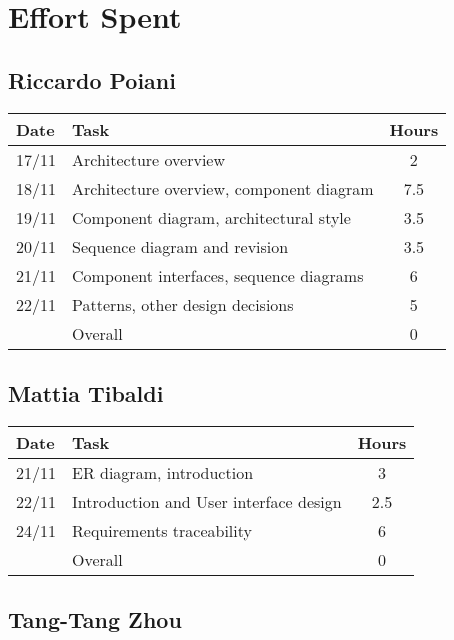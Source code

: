 \section{Effort Spent}

\subsection{Riccardo Poiani}

\begin{table}[H]
\begin{tabularx}{\textwidth}{|l|X|c|}
\hline
\rowcolor[HTML]{C0C0C0} 
Date & Task & Hours\\ \hline
17/11 & Architecture overview & 2\\ \hline
18/11 & Architecture overview, component diagram & 7.5 \\ \hline
19/11 & Component diagram, architectural style & 3.5\\ \hline
20/11 & Sequence diagram and revision & 3.5\\ \hline
21/11 & Component interfaces, sequence diagrams & 6\\ \hline
22/11 & Patterns, other design decisions & 5 \\ \hline
\rowcolor[HTML]{C0C0C0} 
& Overall & 0 \\ \hline
\end{tabularx}
\end{table}

\subsection{Mattia Tibaldi}

\begin{table}[H]
\begin{tabularx}{\textwidth}{|l|X|c|}
\hline
\rowcolor[HTML]{C0C0C0} 
Date & Task & Hours\\ \hline
21/11 & ER diagram, introduction & 3 \\ \hline
22/11 & Introduction and User interface design & 2.5 \\ \hline
24/11 & Requirements traceability & 6 \\ \hline 
\rowcolor[HTML]{C0C0C0} 
& Overall & 0\\ \hline
\end{tabularx}
\end{table}

\subsection{Tang-Tang Zhou}

